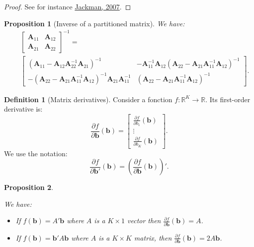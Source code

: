 \documentclass[
  12pt,
]{book}
\providecommand{\tightlist}{%
  \setlength{\itemsep}{0pt}\setlength{\parskip}{0pt}}
\newtheorem{proposition}{Proposition}[chapter]
\theoremstyle{definition}
\newtheorem{definition}{Definition}[chapter]
\theoremstyle{definition}
\theoremstyle{definition}
\theoremstyle{definition}
\theoremstyle{remark}
\begin{document}
\begin{proof}
See for instance \href{http://jackman.stanford.edu/classes/350B/07/ftestforWeb.pdf}{Jackman, 2007}.
\end{proof}

\begin{proposition}[Inverse of a partitioned matrix]
\protect\hypertarget{prp:inversepartitioned}{}\label{prp:inversepartitioned}We have:
\begin{eqnarray*}
&&\left[ \begin{array}{cc} \mathbf{A}_{11} & \mathbf{A}_{12} \\ \mathbf{A}_{21} & \mathbf{A}_{22} \end{array}\right]^{-1} = \\
&&\left[ \begin{array}{cc} (\mathbf{A}_{11} - \mathbf{A}_{12}\mathbf{A}_{22}^{-1}\mathbf{A}_{21})^{-1} & - \mathbf{A}_{11}^{-1}\mathbf{A}_{12}(\mathbf{A}_{22} - \mathbf{A}_{21}\mathbf{A}_{11}^{-1}\mathbf{A}_{12})^{-1} \\
-(\mathbf{A}_{22} - \mathbf{A}_{21}\mathbf{A}_{11}^{-1}\mathbf{A}_{12})^{-1}\mathbf{A}_{21}\mathbf{A}_{11}^{-1} & (\mathbf{A}_{22} - \mathbf{A}_{21}\mathbf{A}_{11}^{-1}\mathbf{A}_{12})^{-1} \end{array} \right].
\end{eqnarray*}
\end{proposition}

\begin{definition}[Matrix derivatives]
\protect\hypertarget{def:FOD}{}\label{def:FOD}Consider a fonction \(f: \mathbb{R}^K \rightarrow \mathbb{R}\). Its first-order derivative is:
\[
\frac{\partial f}{\partial \mathbf{b}}(\mathbf{b}) =
\left[\begin{array}{c}
\frac{\partial f}{\partial b_1}(\mathbf{b})\\
\vdots\\
\frac{\partial f}{\partial b_K}(\mathbf{b})
\end{array}
\right].
\]
We use the notation:
\[
\frac{\partial f}{\partial \mathbf{b}'}(\mathbf{b}) = \left(\frac{\partial f}{\partial \mathbf{b}}(\mathbf{b})\right)'.
\]
\end{definition}

\begin{proposition}
\protect\hypertarget{prp:partial}{}\label{prp:partial}

We have:

\begin{itemize}
\tightlist
\item
  If \(f(\mathbf{b}) = A' \mathbf{b}\) where \(A\) is a \(K \times 1\) vector then \(\frac{\partial f}{\partial \mathbf{b}}(\mathbf{b}) = A\).
\item
  If \(f(\mathbf{b}) = \mathbf{b}'A\mathbf{b}\) where \(A\) is a \(K \times K\) matrix, then \(\frac{\partial f}{\partial \mathbf{b}}(\mathbf{b}) = 2A\mathbf{b}\).
\end{itemize}

\end{proposition}
\end{document}
